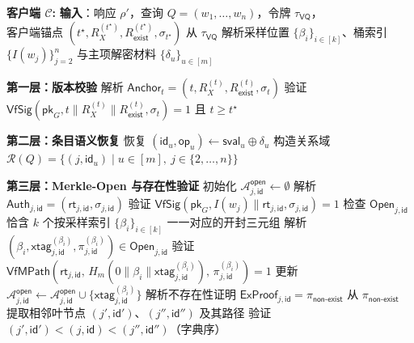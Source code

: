\begin{breakablealgorithm}
\caption{扩展验证流程 $\mathsf{Verify}'$}
\label{alg:commit-verify}
\begin{algorithmic}[1]
\item[] \textbf{客户端 $\mathcal{C}$:}
\STATE \textbf{输入}：响应 $\rho'$，查询 $Q=(w_1,\ldots,w_n)$，令牌 $\tau_{\mathsf{VQ}}$，\\客户端锚点 $(t^\star,R_X^{(t^\star)},R_{\mathsf{exist}}^{(t^\star)},\sigma_{t^\star})$
\STATE 从 $\tau_{\mathsf{VQ}}$ 解析采样位置 $\{\beta_i\}_{i\in[k]}$、桶索引 $\{I(w_j)\}_{j=2}^n$ 与主项解密材料 $\{\delta_u\}_{u\in[m]}$
\item[] \textbf{第一层：版本校验}
\STATE 解析 $\mathsf{Anchor}_t=(t,R_X^{(t)},R_{\mathsf{exist}}^{(t)},\sigma_t)$
\STATE 验证 $\mathsf{VfSig}(\mathsf{pk}_G,t\|R_X^{(t)}\|R_{\mathsf{exist}}^{(t)},\sigma_t)=1$ 且 $t\ge t^\star$
\item[] \textbf{第二层：条目语义恢复}
  \STATE 恢复 $(\mathsf{id}_u,\mathsf{op}_u)\leftarrow \mathsf{sval}_u\oplus\delta_u$
\ENDFOR
\STATE 构造关系域 $\mathcal{R}(Q)=\{(j,\mathsf{id}_u)\mid u\in[m],\ j\in\{2,\ldots,n\}\}$
\item[] \textbf{第三层：Merkle-Open 与存在性验证}
  \STATE 初始化 $\mathcal{A}_{j,\mathsf{id}}^{\mathsf{open}}\leftarrow\emptyset$
    \STATE 解析 $\mathsf{Auth}_{j,\mathsf{id}}=(\mathsf{rt}_{j,\mathsf{id}},\sigma_{j,\mathsf{id}})$
    \STATE 验证 $\mathsf{VfSig}(\mathsf{pk}_G,I(w_j)\|\mathsf{rt}_{j,\mathsf{id}},\sigma_{j,\mathsf{id}})=1$
    \STATE 检查 $\mathsf{Open}_{j,\mathsf{id}}$ 恰含 $k$ 个按采样索引 $\{\beta_i\}_{i\in[k]}$ 一一对应的开封三元组
      \STATE 解析 $(\beta_i,\mathsf{xtag}_{j,\mathsf{id}}^{(\beta_i)},\pi_{j,\mathsf{id}}^{(\beta_i)})\in \mathsf{Open}_{j,\mathsf{id}}$
      \STATE 验证 $\mathsf{VfMPath}(\mathsf{rt}_{j,\mathsf{id}},\,H_m(0\|\beta_i\|\mathsf{xtag}_{j,\mathsf{id}}^{(\beta_i)}),\,\pi_{j,\mathsf{id}}^{(\beta_i)})=1$
      \STATE 更新 $\mathcal{A}_{j,\mathsf{id}}^{\mathsf{open}}\leftarrow \mathcal{A}_{j,\mathsf{id}}^{\mathsf{open}}\cup\{\mathsf{xtag}_{j,\mathsf{id}}^{(\beta_i)}\}$
    \ENDFOR
  \ELSE
    \STATE 解析不存在性证明 $\mathsf{ExProof}_{j,\mathsf{id}}=\pi_{\mathsf{non\text{-}exist}}$
    \STATE 从 $\pi_{\mathsf{non\text{-}exist}}$ 提取相邻叶节点 $(j',\mathsf{id}')$、$(j'',\mathsf{id}'')$ 及其路径
    \STATE 验证 $(j',\mathsf{id}')<(j,\mathsf{id})<(j'',\mathsf{id}'')$（字典序）

\end{algorithmic}
\end{breakablealgorithm}
